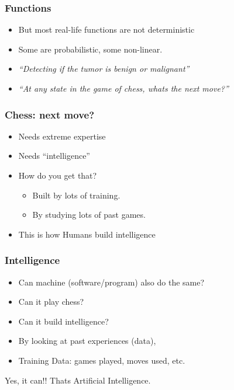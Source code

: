 \begin{frame}[fragile]\frametitle{Functions}
\begin{itemize}
\item But most real-life functions are not deterministic
\item Some are probabilistic, some non-linear.
\item {\em ``Detecting if the tumor is benign or malignant''}
\item {\em ``At any state in the game of chess, whats the next move?''}
\end{itemize}
\end{frame}

\begin{frame}[fragile]\frametitle{Chess: next move?}
\begin{itemize}
\item Needs extreme expertise
\item Needs ``intelligence''
\item How do you get that?
\begin{itemize}
\item Built by lots of training.
\item By studying lots of past games.
\end{itemize}
\item This is how Humans build intelligence
\end{itemize}
\end{frame}

\begin{frame}[fragile]\frametitle{Intelligence}
\begin{itemize}
\item Can machine (software/program) also do the same?
\item Can it play chess?
\item Can it build intelligence?
\item By looking at past experiences (data), 
\item Training Data: games played, moves used, etc.
\end{itemize}
Yes, it can!! Thats Artificial Intelligence.
\end{frame}




